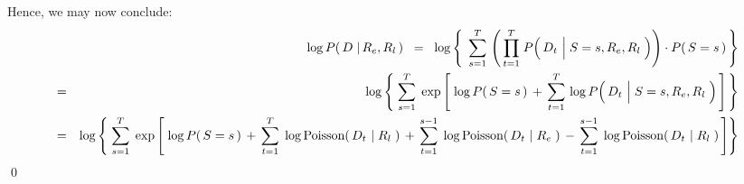 Hence, we may now conclude:
\begin{eqnarray*}
&&
	\log P\!\left(\,D \;\vert\, R_{e},R_{l}\,\right)
\;\; = \;\;
	\log\left\{\;\,
	\overset{T}{\underset{s=1}{\sum}}\,
		\left(\,
			\overset{T}{\underset{t=1}{\prod}}\;
			P\!\left(\,D_{t} \,\left\vert\; S\overset{{\color{white}1}}{=}s,R_{e},R_{l}\right.\,\right)
			\right)
		\cdot
		P\!\left(\,S=s\,\right)
	\,\right\}
\\
& = &
	\log\left\{\;
	\overset{T}{\underset{s=1}{\sum}}\;
	\exp\left[\;
		\log P\!\left(\,S=s\,\right)
		\, + \,
		\overset{T}{\underset{t=1}{\sum}}\,
		\log P\!\left(\,D_{t} \,\left\vert\; S\overset{{\color{white}1}}{=}s,R_{e},R_{l}\right.\,\right)
		\,\right]
	\,\right\}
\\
&=&
	\log\left\{\;
	\overset{T}{\underset{s=1}{\sum}}\;
	\exp\left[\;
			\log P\!\left(\,S=s\,\right)
			\,+\,
			\overset{T}{\underset{t=1}{\sum}}\;
			\log\textnormal{Poisson}\!\left(\,D_{t} \,\left\vert\; R_{l}\right.\,\right)
			\,+\,
			\overset{s-1}{\underset{t=1}{\sum}}\;
			\log\textnormal{Poisson}\!\left(\,D_{t} \,\left\vert\; R_{e}\right.\,\right)
			\,-\,
			\overset{s-1}{\underset{t=1}{\sum}}\;
			\log\textnormal{Poisson}\!\left(\,D_{t} \,\left\vert\; R_{l}\right.\,\right)
		\,\right]
	\right\}
\end{eqnarray*}
\qed


